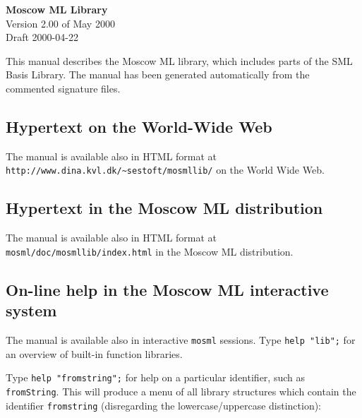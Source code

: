 \documentclass[fleqn,twoside]{article}
\begin{document}
\begin{center}

  \vspace*{0cm}

{\huge\bf Moscow ML Library}\\[0.5cm]

{Version 2.00 of May 2000\\ Draft 2000-04-22}\\[1cm]

\end{center}

\vspace{1cm}

\noindent 
This manual describes the Moscow ML library, which includes parts of
the SML Basis Library\@.  The manual has been generated automatically
from the commented signature files.



\subsection*{Hypertext on the World-Wide Web}

The manual is available also in HTML format at
\verb$http://www.dina.kvl.dk/~sestoft/mosmllib/$ on the World Wide
Web.


\subsection*{Hypertext in the Moscow ML distribution}

The manual is available also in HTML format at
\verb$mosml/doc/mosmllib/index.html$ in the Moscow ML distribution.


\subsection*{On-line help in the Moscow ML interactive system}

The manual is available also in interactive {\tt mosml} sessions.
Type {\tt help "lib";} for an overview of built-in function libraries.

Type {\tt help "fromstring";} for help on a particular identifier,
such as {\tt fromString}.  This will produce a menu of all library
structures which contain the identifier {\tt fromstring} (disregarding
the lowercase/uppercase distinction):
\end{document}
